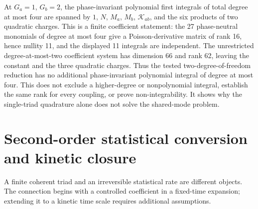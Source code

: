 \documentclass[11pt,a4paper,oneside]{book}
\theoremstyle{plain}
\theoremstyle{definition}
\theoremstyle{remark}
\newcommand{\src}[2]{\cite{#1}}
\begin{document}
At $G_a=1$, $G_b=2$, the phase-invariant polynomial first integrals of
total degree at most four are spanned by $1$, $N$, $M_a$, $M_b$,
$\mathcal K_{ab}$, and the six products of two quadratic charges.
This is a finite coefficient statement: the 27 phase-neutral monomials
of degree at most four give a Poisson-derivative matrix of rank 16,
hence nullity 11, and the displayed 11 integrals are independent.
The unrestricted degree-at-most-two coefficient system has dimension
66 and rank 62, leaving the constant and the three quadratic charges.
Thus the tested two-degree-of-freedom reduction has no additional
phase-invariant polynomial integral of degree at most four.  This does
not exclude a higher-degree or nonpolynomial integral, establish the
same rank for every coupling, or prove non-integrability.  It shows why
the single-triad quadrature alone does not solve the shared-mode problem.
\src{R20}{thm:v20v33-invariants,prop:v20v33-reduced}

\section{Second-order statistical conversion and kinetic closure}
\label{sec:kinetic-conversion}
A finite coherent triad and an irreversible statistical rate are different
objects.  The connection begins with a controlled coefficient in a
fixed-time expansion; extending it to a kinetic time scale requires
additional assumptions.
\end{document}
